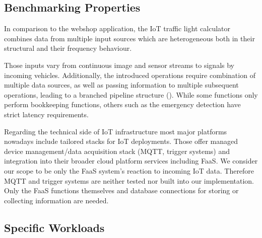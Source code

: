 \documentclass[../main.tex]{subfiles}
\begin{document}
\subsection{Benchmarking Properties}\label{ssec:iotApplicationProperties}

In comparison to the webshop application, the IoT traffic light calculator combines data from multiple input sources
which are heterogeneous both in their structural and their frequency behaviour. 

Those inputs vary from continuous image and sensor streams to signals by incoming vehicles. 
Additionally, the introduced operations require combination of multiple data sources, 
as well as passing information to multiple subsequent operations, 
leading to a branched pipeline structure (). %
While some functions only perform bookkeeping functions, others such as the emergency detection have strict latency requirements.

Regarding the technical side of IoT infrastructure most major platforms nowadays include tailored stacks for IoT deployments\footnotemark.
Those offer managed device management/data acquisition stack (MQTT, trigger systems)
and integration into their broader cloud platform services including FaaS.
We consider our scope to be only the FaaS system's reaction to incoming IoT data. 
Therefore MQTT and trigger systems are neither tested nor built into our implementation. 
Only the FaaS functions themselves and database connections for storing or collecting information are needed.


\subsection{Specific Workloads}\label{ssec:iotSpecificWorkloads}
\end{document}
